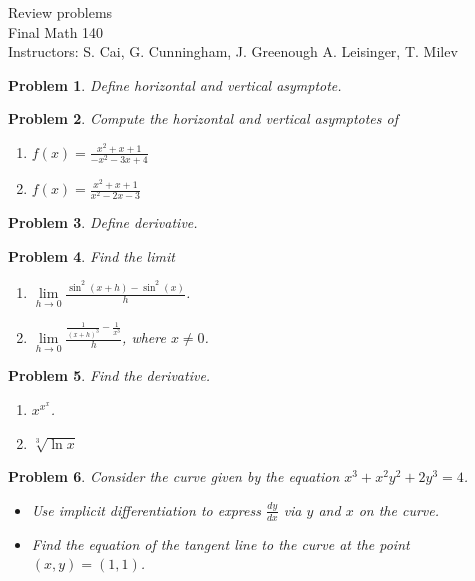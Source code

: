 \documentclass{article}
\newtheorem{problem}{Problem}
\begin{document}
\begin{center}
\Large
Review problems \\ 
Final Math 140 \\
\normalsize Instructors: S. Cai, G. Cunningham, J. Greenough A. Leisinger, T. Milev
\end{center}
\begin{problem}
Define horizontal and vertical asymptote.
\end{problem}
\begin{problem}
Compute the horizontal and vertical asymptotes of 
\begin{enumerate}
\item $
\displaystyle
f(x)=\frac{x^2+x+1}{-x^2- 3x+ 4}
$
\hfill{~}
\item $
\displaystyle
f(x)=\frac{x^2+x+1}{x^2- 2x- 3}
$
\hfill{~}
\end{enumerate}
\end{problem}
\begin{problem}
Define derivative.
\end{problem}
\begin{problem}
Find the limit 
\begin{enumerate}
\item $\displaystyle \lim\limits_{h\to 0} \frac{ \sin^2 (x+h)-\sin^2 (x)}{h}$.
\hfill{~}
\item $\displaystyle \lim\limits_{h\to 0} \frac{ \frac{1}{(x+h)^3}-\frac{1}{x^3}}{h}$, where $x\neq 0$.
\hfill{~}
\end{enumerate}
\end{problem}

\begin{problem}Find the derivative.
\begin{enumerate}
\item 
 $x^{x^x} $.
\hfill{~}
\item $\sqrt[3]{\ln x}$
\hfill{~}
\end{enumerate}
\end{problem}

\begin{problem}
Consider the curve given by the equation $x^3+ x^2y^2+2y^3=4$. 
\begin{itemize}
\item Use implicit differentiation to express $\frac{dy}{dx}$ via $y $ and $x$ on the curve.
\item Find the equation of the tangent line to the curve at the point $(x,y)=(1,1)$.
\end{itemize}
\end{problem}
\end{document}
